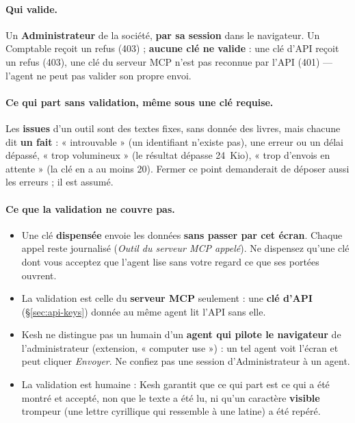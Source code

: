 \documentclass[a4paper,11pt,oneside]{article}
\begin{document}
\paragraph{Qui valide.} Un \textbf{Administrateur} de la société, \textbf{par sa session} dans le navigateur. Un Comptable reçoit un refus (403) ; \textbf{aucune clé ne valide} : une clé d'API reçoit un refus (403), une clé du serveur MCP n'est pas reconnue par l'API (401) --- l'agent ne peut pas valider son propre envoi.

\paragraph{Ce qui part sans validation, même sous une clé requise.} Les \textbf{issues} d'un outil sont des textes fixes, sans donnée des livres, mais chacune dit \textbf{un fait} : « introuvable » (un identifiant n'existe pas), une erreur ou un délai dépassé, « trop volumineux » (le résultat dépasse 24~Kio), « trop d'envois en attente » (la clé en a au moins 20). Fermer ce point demanderait de déposer aussi les erreurs ; il est assumé.

\paragraph{Ce que la validation ne couvre pas.}
\begin{itemize}
    \item Une clé \textbf{dispensée} envoie les données \textbf{sans passer par cet écran}. Chaque appel reste journalisé (\emph{Outil du serveur MCP appelé}). Ne dispensez qu'une clé dont vous acceptez que l'agent lise sans votre regard ce que ses portées ouvrent.
    \item La validation est celle du \textbf{serveur MCP} seulement : une \textbf{clé d'API} (\S\ref{sec:api-keys}) donnée au même agent lit l'API sans elle.
    \item Kesh ne distingue pas un humain d'un \textbf{agent qui pilote le navigateur} de l'administrateur (extension, « computer use ») : un tel agent voit l'écran et peut cliquer \emph{Envoyer}. Ne confiez pas une session d'Administrateur à un agent.
    \item La validation est humaine : Kesh garantit que ce qui part est ce qui a été montré et accepté, non que le texte a été lu, ni qu'un caractère \textbf{visible} trompeur (une lettre cyrillique qui ressemble à une latine) a été repéré.
\end{itemize}
\end{document}

